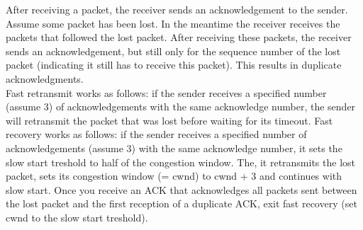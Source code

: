 After receiving a packet, the receiver sends an acknowledgement to the sender. \\
Assume some packet has been lost. In the meantime the receiver receives the packets that followed the lost packet.
After receiving these packets, the receiver sends an acknowledgement, but still only for the sequence number of the lost packet (indicating it still has to receive this packet).
This results in duplicate acknowledgments. \\
Fast retransmit works as follows: if the sender receives a specified number (assume 3) of acknowledgements with the same acknowledge number, the sender will retransmit the packet that was lost before waiting for its timeout.
Fast recovery works as follows: if the sender receives a specified number of acknowledgements (assume 3) with the same acknowledge number, it sets the slow start treshold to half of the congestion window.
The, it retransmits the lost packet, sets its congestion window (= cwnd) to cwnd + 3 and continues with slow start.
Once you receive an ACK that acknowledges all packets sent between the lost packet and the first reception of a duplicate ACK, exit fast recovery (set cwnd to the slow start treshold).